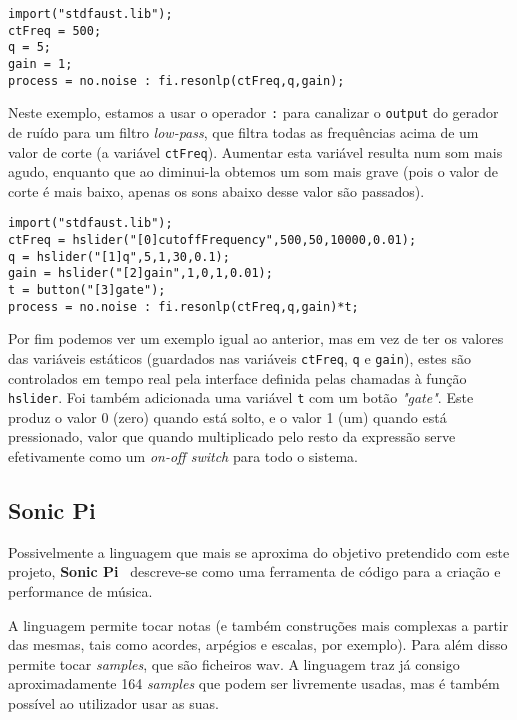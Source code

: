 \begin{lstlisting}[caption={Geração de ruído aleatório com um filtro \textit{low-pass}},captionpos=b]
import("stdfaust.lib");
ctFreq = 500;
q = 5;
gain = 1;
process = no.noise : fi.resonlp(ctFreq,q,gain);
\end{lstlisting}
Neste exemplo, estamos a usar o operador \texttt{:} para canalizar o \texttt{output} do gerador de ruído para um filtro \textit{low-pass}, que filtra todas as frequências acima de um valor de corte (a variável \texttt{ctFreq}). Aumentar esta variável resulta num som mais agudo, enquanto que ao diminui-la obtemos um som mais grave (pois o valor de corte é mais baixo, apenas os sons abaixo desse valor são passados).

\begin{lstlisting}[caption={Geração de ruído aleatório com um filtro \textit{low-pass} controlada por uma interface},captionpos=b]
import("stdfaust.lib");
ctFreq = hslider("[0]cutoffFrequency",500,50,10000,0.01);
q = hslider("[1]q",5,1,30,0.1);
gain = hslider("[2]gain",1,0,1,0.01);
t = button("[3]gate");
process = no.noise : fi.resonlp(ctFreq,q,gain)*t;
\end{lstlisting}
Por fim podemos ver um exemplo igual ao anterior, mas em vez de ter os valores das variáveis estáticos (guardados nas variáveis \texttt{ctFreq}, \texttt{q} e \texttt{gain}), estes são controlados em tempo real pela interface definida pelas chamadas à função \texttt{hslider}. Foi também adicionada uma variável \texttt{t} com um botão \textit{"gate"}. Este produz o valor 0 (zero) quando está solto, e o valor 1 (um) quando está pressionado, valor que quando multiplicado pelo resto da expressão serve efetivamente como um \textit{on-off switch} para todo o sistema.

\subsection{Sonic Pi}
Possivelmente a linguagem que mais se aproxima do objetivo pretendido com este projeto, \textbf{Sonic Pi}~\cite{sonic-pi} descreve-se como uma ferramenta de código para a criação e performance de música.

A linguagem permite tocar notas (e também construções mais complexas a partir das mesmas, tais como acordes, arpégios e escalas, por exemplo). Para além disso permite tocar \textit{samples}, que são ficheiros \acrfull{wav}. A linguagem traz já consigo aproximadamente 164 \textit{samples} que podem ser livremente usadas, mas é também possível ao utilizador usar as suas.

